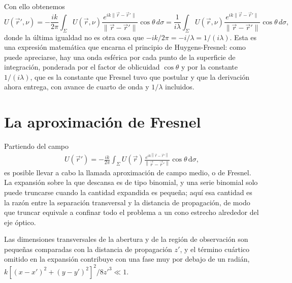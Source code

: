 		Con ello obtenemos
		\begin{equation}\label{eq:RSfinal}
			U(\vec{r}',\nu) = -\dfrac{ik}{2\pi} \int_{\Sigma} U(\vec{r},\nu)\dfrac{e^{ik\|\vec{r}-\vec{r}'\|}}{\|\vec{r}-\vec{r}'\|} \cos\theta\,d\sigma = \dfrac{1}{i\lambda} \int_{\Sigma} U(\vec{r},\nu)\dfrac{e^{ik\|\vec{r}-\vec{r}'\|}}{\|\vec{r}-\vec{r}'\|} \cos\theta\,d\sigma,
		\end{equation}
		donde la última igualdad no es otra cosa que $-ik/2\pi = -i/\lambda = 1/(i\lambda)$. Esta es una expresión matemática que encarna el principio de Huygens-Fresnel: como puede apreciarse, hay una onda esférica por cada punto de la superficie de integración, ponderada por el factor de oblicuidad $\cos\theta$ y por la constante $1/(i\lambda)$, que es la constante que Fresnel tuvo que postular y que la derivación ahora entrega, con avance de cuarto de onda y $1/\lambda$ incluidos.

\section{La aproximación de Fresnel}

Partiendo del campo
\begin{align}
	U(\vec{r}') = -\frac{ik}{2\pi}\int_{\Sigma} U(\vec{r}) \frac{e^{ik \left\| \vec{r} - \vec{r}' \right\|}}{\left\| \vec{r} - \vec{r}' \right\|} \cos\theta \, \mathrm{d}\sigma,
\end{align}
es posible llevar a cabo la llamada aproximación de campo medio, o de Fresnel. La expansión sobre la que descansa es de tipo binomial, y una serie binomial solo puede truncarse cuando la cantidad expandida es pequeña; aquí esa cantidad es la razón entre la separación transversal y la distancia de propagación, de modo que truncar equivale a confinar todo el problema a un cono estrecho alrededor del eje óptico.

\begin{Assumption}
	Las dimensiones transversales de la abertura y de la región de observación son pequeñas comparadas con la distancia de propagación $z'$, y el término cuártico omitido en la expansión contribuye con una fase muy por debajo de un radián, $k\left[(x-x')^{2}+(y-y')^{2}\right]^{2}/8z'^{3} \ll 1$.
\end{Assumption}

